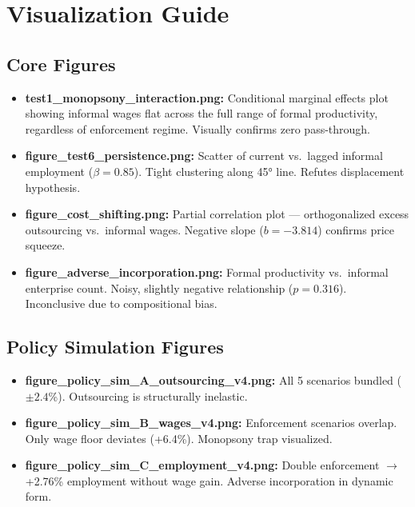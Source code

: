 \documentclass[11pt]{article}
\begin{document}
	\section{Visualization Guide}
	
	\subsection*{Core Figures}
	\begin{itemize}
		\item \textbf{test1\_monopsony\_interaction.png:} Conditional marginal effects plot showing informal wages flat across the full range of formal productivity, regardless of enforcement regime. Visually confirms zero pass-through.
		\item \textbf{figure\_test6\_persistence.png:} Scatter of current vs.\ lagged informal employment ($\beta=0.85$). Tight clustering along 45° line. Refutes displacement hypothesis.
		\item \textbf{figure\_cost\_shifting.png:} Partial correlation plot — orthogonalized excess outsourcing vs.\ informal wages. Negative slope ($b=-3.814$) confirms price squeeze.
		\item \textbf{figure\_adverse\_incorporation.png:} Formal productivity vs.\ informal enterprise count. Noisy, slightly negative relationship ($p=0.316$). Inconclusive due to compositional bias.
	\end{itemize}
	
	\subsection*{Policy Simulation Figures}
	\begin{itemize}
		\item \textbf{figure\_policy\_sim\_A\_outsourcing\_v4.png:} All 5 scenarios bundled ($\pm 2.4$\%). Outsourcing is structurally inelastic.
		\item \textbf{figure\_policy\_sim\_B\_wages\_v4.png:} Enforcement scenarios overlap. Only wage floor deviates (+6.4\%). Monopsony trap visualized.
		\item \textbf{figure\_policy\_sim\_C\_employment\_v4.png:} Double enforcement $\to$ +2.76\% employment without wage gain. Adverse incorporation in dynamic form.
	\end{itemize}
	
\end{document}

